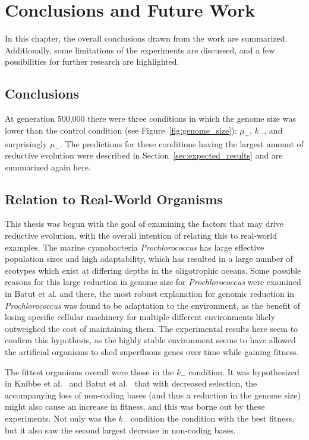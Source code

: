 
\chapter{Conclusions and Future Work}\label{ch:05conclusion}

In this chapter, the overall conclusions drawn from the work are summarized. Additionally, some limitations of the experiments are discussed, and a few possibilities for further research are highlighted.

\section{Conclusions}
At generation 500,000 there were three conditions in which the genome size was lower than the control condition (see Figure~\ref{fig:genome_size}): $\mu_+$, $k_-$, and surprisingly $\mu_-$. The predictions for these conditions having the largest amount of reductive evolution were described in Section~\ref{sec:expected_results} and are summarized again here. 

\section{Relation to Real-World Organisms}

This thesis was begun with the goal of examining the factors that may drive reductive evolution, with the overall intention of relating this to real-world examples. The marine cyanobacteria \textit{Prochlorococcus} has large effective population sizes and high adaptability, which has resulted in a large number of ecotypes which exist at differing depths in the oligotrophic oceans. Some possible reasons for this large reduction in genome size for \textit{Prochlorococcus} were examined in Batut et al.\cite{Batut.2014} and there, the most robust explanation for genomic reduction in \textit{Prochlorococcus} was found to be adaptation to the environment, as the benefit of losing specific cellular machinery for multiple different environments likely outweighed the cost of maintaining them. The experimental results here seem to confirm this hypothesis, as the highly stable environment seems to have allowed the artificial organisms to shed superfluous genes over time while gaining fitness. 

The fittest organisms overall were those in the $k_-$ condition. It was hypothesized in Knibbe et al.~\cite{Knibbe2007} and Batut et al.~\cite{Batut.2013} that with decreased selection, the accompanying loss of non-coding bases (and thus a reduction in the genome size) might also cause an increase in fitness, and this was borne out by these experiments. Not only was the $k_-$ condition the condition with the best fitness, but it also saw the second largest decrease in non-coding bases. 
  
